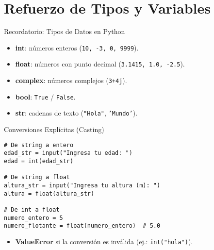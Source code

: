 \documentclass[10pt]{beamer}
\begin{document}
\section{Refuerzo de Tipos y Variables}

\begin{frame}{Recordatorio: Tipos de Datos en Python}
  \begin{itemize}
    \item \textbf{int}: números enteros (\texttt{10, -3, 0, 9999}).
    \item \textbf{float}: números con punto decimal (\texttt{3.1415, 1.0, -2.5}).
    \item \textbf{complex}: números complejos (\texttt{3+4j}).
    \item \textbf{bool}: \texttt{True} / \texttt{False}.
    \item \textbf{str}: cadenas de texto (\texttt{"Hola"}, \texttt{'Mundo'}).
  \end{itemize}
\end{frame}

\begin{frame}[fragile]{Conversiones Explícitas (Casting)}
\begin{verbatim}
# De string a entero
edad_str = input("Ingresa tu edad: ")
edad = int(edad_str)

# De string a float
altura_str = input("Ingresa tu altura (m): ")
altura = float(altura_str)

# De int a float
numero_entero = 5
numero_flotante = float(numero_entero)  # 5.0
\end{verbatim}
\begin{itemize}
  \item \textbf{ValueError} si la conversión es inválida (ej.: \texttt{int("hola")}).
\end{itemize}
\end{frame}
\end{document}
